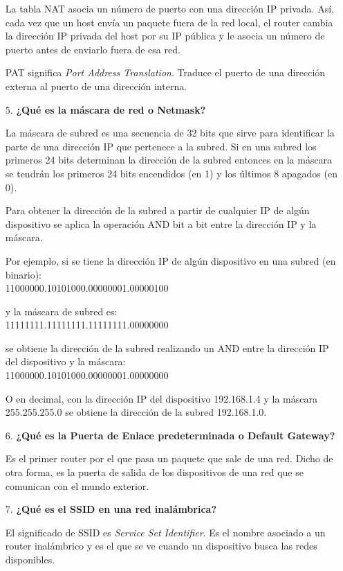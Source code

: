 \documentclass{article}
\begin{document}
\begin{itemize}
La tabla NAT asocia un número de puerto con una dirección IP privada. Así, cada vez que un host envía un paquete fuera de la red local, el router cambia la dirección IP privada del host por su IP pública y le asocia un número de puerto antes de enviarlo fuera de esa red.

PAT significa \textit{Port Address Translation}. Traduce el puerto de una dirección externa al puerto de una dirección interna.

\item[5.] \textbf{¿Qué es la máscara de red o Netmask?}

La máscara de subred es una secuencia de 32 bits que sirve para identificar la parte de una dirección IP que pertenece a la subred. Si en una subred los primeros 24 bits determinan la dirección de la subred entonces en la máscara se tendrán los primeros 24 bits encendidos (en 1) y los últimos 8 apagados (en 0).

Para obtener la dirección de la subred a partir de cualquier IP de algún dispositivo se aplica la operación AND bit a bit entre la dirección IP y la máscara.

Por ejemplo, si se tiene la dirección IP de algún dispositivo en una subred (en binario):\\
11000000.10101000.00000001.00000100

y la máscara de subred es:\\
11111111.11111111.11111111.00000000

se obtiene la dirección de la subred realizando un AND entre la dirección IP del dispositivo y la máscara:\\
11000000.10101000.00000001.00000000

O en decimal, con la dirección IP del dispositivo 192.168.1.4 y la máscara 255.255.255.0 se obtiene la dirección de la subred 192.168.1.0.

\item[6.] \textbf{¿Qué es la Puerta de Enlace predeterminada o Default Gateway?}

Es el primer router por el que pasa un paquete que sale de una red. Dicho de otra forma, es la puerta de salida de los dispositivos de una red que se comunican con el mundo exterior.

\item[7.] \textbf{¿Qué es el SSID en una red inalámbrica?}

El significado de SSID es \textit{Service Set Identifier}. Es el nombre asociado a un router inalámbrico y es el que se ve cuando un dispositivo busca las redes disponibles. 


\end{itemize}
\end{document}
